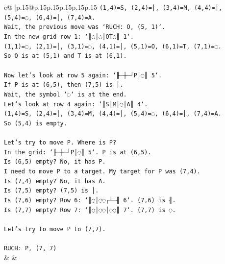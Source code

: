 \documentclass{article}
\begin{document}
{\begin{supertabular}{c@{$\;$}|p{.15\linewidth}@{}p{.15\linewidth}p{.15\linewidth}p{.15\linewidth}p{.15\linewidth}p{.15\linewidth}}
{{{\texttt{(1,4)=S, (2,4)=│, (3,4)=M, (4,4)=│, (5,4)=◌, (6,4)=│, (7,4)=A.} \\
\texttt{Wait, the previous move was `RUCH: O, (5, 1)`.} \\
\texttt{In the new grid row 1: `║◌│◌│OT◌║ 1`.} \\
\texttt{(1,1)=◌, (2,1)=│, (3,1)=◌, (4,1)=│, (5,1)=O, (6,1)=T, (7,1)=◌.} \\
\texttt{So O is at (5,1) and T is at (6,1).} \\
\\ 
\texttt{Now let's look at row 5 again: `╟─┼─┘P│◌║ 5`.} \\
\texttt{If P is at (6,5), then (7,5) is │.} \\
\texttt{Wait, the symbol `◌` is at the end.} \\
\texttt{Let's look at row 4 again: `║S│M│◌│A║ 4`.} \\
\texttt{(1,4)=S, (2,4)=│, (3,4)=M, (4,4)=│, (5,4)=◌, (6,4)=│, (7,4)=A.} \\
\texttt{So (5,4) is empty.} \\
\\ 
\texttt{Let's try to move P. Where is P?} \\
\texttt{In the grid: `╟─┼─┘P│◌║ 5`. P is at (6,5).} \\
\texttt{Is (6,5) empty? No, it has P.} \\
\texttt{I need to move P to a target. My target for P was (7,4).} \\
\texttt{Is (7,4) empty? No, it has A.} \\
\texttt{Is (7,5) empty? (7,5) is │.} \\
\texttt{Is (7,6) empty? Row 6: `║◌│◌◌┌┴─╢ 6`. (7,6) is ╢.} \\
\texttt{Is (7,7) empty? Row 7: `║◌│◌◌│◌◌║ 7`. (7,7) is ◌.} \\
\\ 
\texttt{Let's try to move P to (7,7).} \\
\\ 
\texttt{RUCH: P, (7, 7)} \\
            }
        }
    }
    & & \\ \\


\end{supertabular}}
\end{document}

